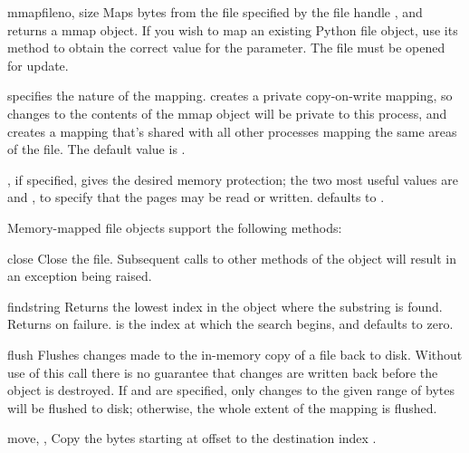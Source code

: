 \begin{funcdesc}{mmap}{fileno, size}
  Maps  bytes from the file
specified by the file handle , and returns a mmap object.
If you wish to map an existing Python file object, use its
 method to obtain the correct value for the
 parameter.  The file must be opened for update.

 specifies the nature of the mapping.  
 creates a private copy-on-write mapping, so
changes to the contents of the mmap object will be private to this
process, and  creates a mapping that's shared
with all other processes mapping the same areas of the file.
The default value is .

, if specified, gives the desired memory protection; the two 
most useful values are  and ,
to specify that the pages may be read or written.
 defaults to .
\end{funcdesc}

Memory-mapped file objects support the following methods:


\begin{methoddesc}{close}{}
Close the file.  Subsequent calls to other methods of the object
will result in an exception being raised.
\end{methoddesc}

\begin{methoddesc}{find}{string}
Returns the lowest index in the object where the substring
 is found.  Returns  on failure.   is
the index at which the search begins, and defaults to zero.
\end{methoddesc}

\begin{methoddesc}{flush}{}
Flushes changes made to the in-memory copy of a file back to disk.
Without use of this call there is no guarantee that changes are
written back before the object is destroyed.  If  and
 are specified, only changes to the given range of bytes
will be flushed to disk; otherwise, the whole extent of the mapping is
flushed.
\end{methoddesc}

\begin{methoddesc}{move}{, , }
Copy the  bytes starting at offset  
to the destination index .
\end{methoddesc}

